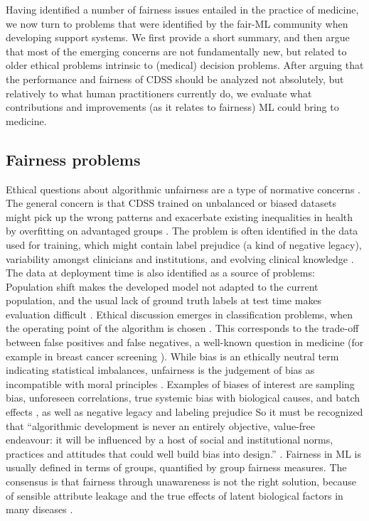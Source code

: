 Having identified a number of fairness issues entailed in the practice of medicine, we now turn to problems that were identified by the fair-ML community when developing support systems.
We first provide a short summary, and then argue that most of the emerging concerns are not fundamentally new, but related to older ethical problems intrinsic to (medical) decision problems.
After arguing that the performance and fairness of CDSS should be analyzed not absolutely, but relatively to what human practitioners currently do,
we evaluate what contributions and improvements (as it relates to fairness) ML could bring to medicine. 


\subsection{Fairness problems}
    Ethical questions about algorithmic unfairness are a type of normative concerns \cite{Morley2020}.
    The general concern is that CDSS trained on unbalanced or biased datasets might pick up the wrong patterns and exacerbate existing inequalities in health by overfitting on advantaged groups \cite{Morley2020, Chen2021}.
    The problem is often identified in the data used for training, which might contain label prejudice (a kind of negative legacy), variability amongst clinicians and institutions, and evolving clinical knowledge \cite{Chen2021}.
    The data at deployment time is also identified as a source of problems: Population shift makes the developed model not adapted to the current population, and the usual lack of ground truth labels at test time makes evaluation difficult \cite{Chen2021}.
    Ethical discussion emerges in classification problems, when the operating point of the algorithm is chosen \cite{Fletcher2021}.
    This corresponds to the trade-off between false positives and false negatives, a well-known question in medicine (for example in breast cancer screening \cite{Fletcher2021}).
    While bias is an ethically neutral term indicating statistical imbalances, unfairness is the judgement of bias as incompatible with moral principles \cite{Fletcher2021}.
    Examples of biases of interest are sampling bias, unforeseen correlations, true systemic bias with biological causes, and batch effects \cite{Fletcher2021}, as well as negative legacy and labeling prejudice \cite{Chen2021}
    So it must be recognized that ``algorithmic development is never an entirely objective, value-free endeavour: it will be influenced by a host of social and institutional norms, practices and attitudes that could well build bias into design.'' \cite[p.~673]{Zerilli2019}.
    Fairness in ML is usually defined in terms of groups, quantified by group fairness measures.
    The consensus is that fairness through unawareness is not the right solution, because of sensible attribute leakage and the true effects of latent biological factors in many diseases \cite{Chen2021}.



